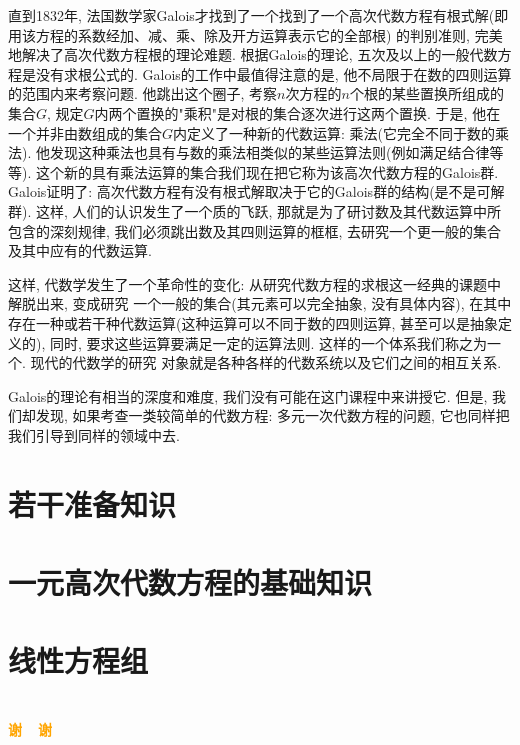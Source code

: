 \documentclass[aspectratio=43]{beamer}
\begin{document}
\begin{frame}
	直到1832年, 法国数学家Galois才找到了一个找到了一个高次代数方程有根式解(即用该方程的系数经加、减、乘、除及开方运算表示它的全部根)
	的判别准则, 完美地解决了高次代数方程根的理论难题. 根据Galois的理论, 五次及以上的一般代数方程是没有求根公式的.
	Galois的工作中最值得注意的是, 他不局限于在数的四则运算的范围内来考察问题. 他跳出这个圈子, 考察$n$次方程的$n$个根的某些置换所组成的集合$G$,
	规定$G$内两个置换的"乘积"是对根的集合逐次进行这两个置换. 于是, 他在一个并非由数组成的集合$G$内定义了一种新的代数运算: 乘法(它完全不同于数的乘法).
	他发现这种乘法也具有与数的乘法相类似的某些运算法则(例如满足结合律等等). 这个新的具有乘法运算的集合我们现在把它称为该高次代数方程的Galois群. Galois证明了:
	高次代数方程有没有根式解取决于它的Galois群的结构(是不是可解群). 这样, 人们的认识发生了一个质的飞跃, 那就是为了研讨数及其代数运算中所包含的深刻规律,
	我们必须跳出数及其四则运算的框框, 去研究一个更一般的集合及其中应有的代数运算.
\end{frame}

\begin{frame}
	这样, 代数学发生了一个革命性的变化: 从研究代数方程的求根这一经典的课题中解脱出来, 变成研究
	一个一般的集合(其元素可以完全抽象, 没有具体内容), 在其中存在一种或若干种代数运算(这种运算可以不同于数的四则运算, 甚至可以是抽象定义的),
	同时, 要求这些运算要满足一定的运算法则. 这样的一个体系我们称之为一个{}. 现代的代数学的研究
	对象就是各种各样的代数系统以及它们之间的相互关系.

	Galois的理论有相当的深度和难度, 我们没有可能在这门课程中来讲授它. 但是, 我们却发现, 如果考查一类较简单的代数方程:
	多元一次代数方程的问题, 它也同样把我们引导到同样的领域中去. 
\end{frame}

\begin{frame}

\end{frame}

\section{若干准备知识}

\section{一元高次代数方程的基础知识}

\section{线性方程组}

\section{}
\begin{frame}{}
\centering
\Huge\bfseries
\textcolor{orange}{谢~~谢}
\end{frame}
\end{document}
